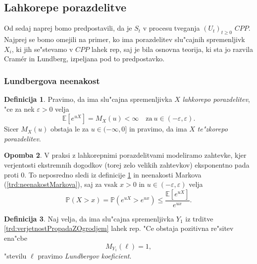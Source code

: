 \documentclass[12pt, a4paper, reqno]{amsart}
\theoremstyle{definition}
\newtheorem{definicija}{Definicija}[section]
\newtheorem{opomba}[definicija]{Opomba}
\theoremstyle{plain}
\newcommand{\E}{\mathbb{E}}
\newcommand{\Prob}{\mathbb{P}}
\newcommand{\1}{\mathds{1}}
\begin{document}
    \subsection{Lahkorepe porazdelitve}
        Od sedaj naprej bomo predpostavili, da je $S_t$ v procesu tveganja $(U_t)_{t\geq0}$ $CPP$.
        Najprej se bomo omejili na primer, ko ima porazdelitev slu"cajnih spremenljivk $X_i$, ki jih 
        se"stevamo v $CPP$ lahek rep, saj je bila osnovna teorija, ki sta jo razvila Cramér in Lundberg,
        izpeljana pod to predpostavko.
        \subsubsection{Lundbergova neenakost}
            \begin{definicija}
                Pravimo, da ima slu"cajna spremenljivka $X$ \textit{lahkorepo porazdelitev}, "ce za 
                nek $\varepsilon > 0$ velja
            \begin{equation*}
                \E\left[e^{uX}\right] = M_X(u) < \infty \quad \text{za} \ u \in (-\varepsilon, \varepsilon).
            \end{equation*}
            Sicer $M_X(u)$ obstaja le za $u\in(-\infty, 0]$ in pravimo, 
            da ima $X$ \textit{te"zkorepo porazdelitev}.
            \label{def:lahkorepnaPorazdelitev}
            \end{definicija}

            \begin{opomba}
                V praksi z lahkorepnimi porazdelitvami modeliramo zahtevke, kjer verjentosti ekstremnih 
                dogodkov (torej zelo velikih zahtevkov) eksponentno pada proti $0$. To neposredno sledi iz 
                definicije \ref{def:lahkorepnaPorazdelitev} in neenakosti Markova (\ref{trd:neenakostMarkova}), 
                saj za vsak 
                $x>0$ in $u\in(-\varepsilon, \varepsilon)$ velja
                \begin{equation*}
                    \Prob\left(X > x\right) = \Prob\left(e^{uX} > e^{ux}\right) \leq \frac{\E\left[e^{uX}\right]}{e^{ux}}.
                \end{equation*}
                \label{op:lahkorepnaPorazdelitev}
            \end{opomba}

            \begin{definicija}
                Naj velja, da ima slu"cajna spremenljivka $Y_1$ iz trditve \ref{trd:verjetnostPropadaZOgrodjem} 
                lahek rep. "Ce obstaja pozitivna re"sitev ena"cbe
                \begin{equation*}
                    M_{Y_1}(\ell)  = 1,
                \end{equation*}
                "stevilu $\ell$ pravimo \textit{Lundbergov koeficient}.
                \label{def:LundbergovKoeficient}
            \end{definicija}
\end{document}
